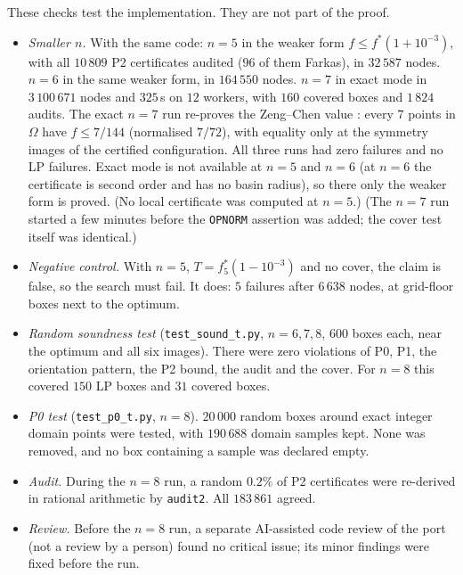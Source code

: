 \documentclass[11pt]{amsart}
\theoremstyle{definition}
\newcommand{\Om}{\Omega}
\begin{document}
These checks test the implementation. They are not part of the proof. %
\begin{itemize}
\item \emph{Smaller $n$.} With the same code: $n = 5$ in the weaker form $f \le f^*(1+10^{-3})$, with all $10\,809$ P2 certificates audited ($96$ of them Farkas), in $32\,587$ nodes. $n = 6$ in the same weaker form, in $164\,550$ nodes. $n = 7$ in exact mode in $3\,100\,671$ nodes and $325$\,s on $12$ workers, with $160$ covered boxes and $1\,824$ audits. The exact $n = 7$ run re-proves the Zeng--Chen value \cite{ZC19}: every $7$ points in $\Om$ have $f \le 7/144$ (normalised $7/72$), with equality only at the symmetry images of the certified configuration. All three runs had zero failures and no LP failures. Exact mode is not available at $n = 5$ and $n = 6$ (at $n = 6$ the certificate is second order and has no basin radius), so there only the weaker form is proved. (No local certificate was computed at $n = 5$.) (The $n = 7$ run started a few minutes before the \texttt{OPNORM} assertion was added; the cover test itself was identical.)
\item \emph{Negative control.} With $n = 5$, $T = f^*_5(1-10^{-3})$ and no cover, the claim is false, so the search must fail. It does: $5$ failures after $6\,638$ nodes, at grid-floor boxes next to the optimum.
\item \emph{Random soundness test} (\texttt{test\_sound\_t.py}, $n = 6, 7, 8$, $600$ boxes each, near the optimum and all six images). There were zero violations of P0, P1, the orientation pattern, the P2 bound, the audit and the cover. For $n = 8$ this covered $150$ LP boxes and $31$ covered boxes.
\item \emph{P0 test} (\texttt{test\_p0\_t.py}, $n = 8$). $20\,000$ random boxes around exact integer domain points were tested, with $190\,688$ domain samples kept. None was removed, and no box containing a sample was declared empty.
\item \emph{Audit.} During the $n = 8$ run, a random $0.2\%$ of P2 certificates were re-derived in rational arithmetic by \texttt{audit2}. All $183\,861$ agreed.
\item \emph{Review.} Before the $n = 8$ run, a separate AI-assisted code review of the port (not a review by a person) found no critical issue; its minor findings were fixed before the run.
\end{itemize}

\end{document}
